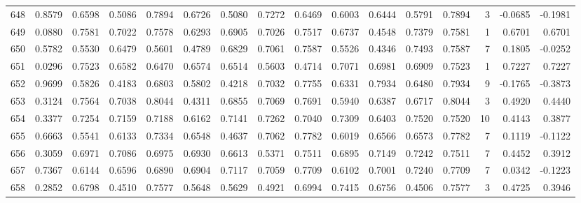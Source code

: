 \begin{tabular}{lrrrrrrrrrrrrrrr}
648 &      0.8579 &  0.6598 &  0.5086 &  0.7894 &  0.6726 &  0.5080 &  0.7272 &  0.6469 &  0.6003 &  0.6444 &   0.5791 &     0.7894 &      3 &                   -0.0685 &                    -0.1981 \\
649 &      0.0880 &  0.7581 &  0.7022 &  0.7578 &  0.6293 &  0.6905 &  0.7026 &  0.7517 &  0.6737 &  0.4548 &   0.7379 &     0.7581 &      1 &                    0.6701 &                     0.6701 \\
650 &      0.5782 &  0.5530 &  0.6479 &  0.5601 &  0.4789 &  0.6829 &  0.7061 &  0.7587 &  0.5526 &  0.4346 &   0.7493 &     0.7587 &      7 &                    0.1805 &                    -0.0252 \\
651 &      0.0296 &  0.7523 &  0.6582 &  0.6470 &  0.6574 &  0.6514 &  0.5603 &  0.4714 &  0.7071 &  0.6981 &   0.6909 &     0.7523 &      1 &                    0.7227 &                     0.7227 \\
652 &      0.9699 &  0.5826 &  0.4183 &  0.6803 &  0.5802 &  0.4218 &  0.7032 &  0.7755 &  0.6331 &  0.7934 &   0.6480 &     0.7934 &      9 &                   -0.1765 &                    -0.3873 \\
653 &      0.3124 &  0.7564 &  0.7038 &  0.8044 &  0.4311 &  0.6855 &  0.7069 &  0.7691 &  0.5940 &  0.6387 &   0.6717 &     0.8044 &      3 &                    0.4920 &                     0.4440 \\
654 &      0.3377 &  0.7254 &  0.7159 &  0.7188 &  0.6162 &  0.7141 &  0.7262 &  0.7040 &  0.7309 &  0.6403 &   0.7520 &     0.7520 &     10 &                    0.4143 &                     0.3877 \\
655 &      0.6663 &  0.5541 &  0.6133 &  0.7334 &  0.6548 &  0.4637 &  0.7062 &  0.7782 &  0.6019 &  0.6566 &   0.6573 &     0.7782 &      7 &                    0.1119 &                    -0.1122 \\
656 &      0.3059 &  0.6971 &  0.7086 &  0.6975 &  0.6930 &  0.6613 &  0.5371 &  0.7511 &  0.6895 &  0.7149 &   0.7242 &     0.7511 &      7 &                    0.4452 &                     0.3912 \\
657 &      0.7367 &  0.6144 &  0.6596 &  0.6890 &  0.6904 &  0.7117 &  0.7059 &  0.7709 &  0.6102 &  0.7001 &   0.7240 &     0.7709 &      7 &                    0.0342 &                    -0.1223 \\
658 &      0.2852 &  0.6798 &  0.4510 &  0.7577 &  0.5648 &  0.5629 &  0.4921 &  0.6994 &  0.7415 &  0.6756 &   0.4506 &     0.7577 &      3 &                    0.4725 &                     0.3946 \\

\end{tabular}
